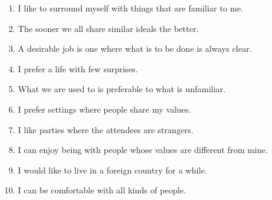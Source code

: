 \begin{enumerate}[resume]
\item I like to surround myself with things that are familiar to me.
\item The sooner we all share similar ideals the better.
\item A desirable job is one where what is to be done is always clear.
\item I prefer a life with few surprises.
\item What we are used to is preferable to what is unfamiliar.
\item I prefer settings where people share my values.
\item I like parties where the attendees are strangers.
\item I can enjoy being with people whose values are different from mine.
\item I would like to live in a foreign country for a while.
\item I can be comfortable with all kinds of people.
\end{enumerate}

